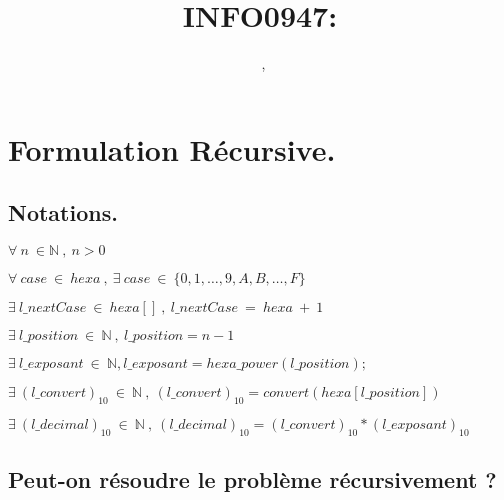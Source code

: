 \documentclass[a4paper, 11pt, oneside]{article}
\title{INFO0947: \intitule}
\author{\textsc{\Prenom}~\textsc{\Nom}, \matricule}
\date{}
\newcommand{\tablemat}{~}
\renewcommand{\tablemat}{\tableofcontents}
\begin{document}
\maketitle
\newpage
\tablemat
\newpage




\section{Formulation Récursive.}\label{formulation}

	\subsection{Notations.}	
	
	$\forall ~ n ~ \in \mathbb{N} ~ , ~ n > 0 $
	\vspace{2mm}
	
	$\forall ~ case ~ \in ~ hexa ~ , ~ \exists ~ case ~ \in ~ \{0, 1, \ldots , 9, A, B, \ldots , F\}$
	\vspace{2mm}
	
	$\exists ~ l\_nextCase ~ \in ~ hexa[] ~ , ~ l\_nextCase ~ = ~ hexa ~ + ~ 1 $
	\vspace{2mm}
	
	$\exists ~ l\_position ~ \in ~ \mathbb{N} ~ , ~ l\_position = n - 1$
	\vspace{2mm}
	
	$\exists ~ l\_exposant ~ \in ~ \mathbb{N} , l\_exposant = hexa\_power(l\_position);$
	\vspace{2mm}
	
	$\exists ~ (l\_convert)_{10} ~ \in ~ \mathbb{N} ~ , ~ (l\_convert)_{10} = convert(hexa[l\_position]) $
	\vspace{2mm}
	
	$\exists ~ (l\_decimal)_{10} ~ \in ~ \mathbb{N} ~ , ~ (l\_decimal)_{10} = (l\_convert)_{10} * (l\_exposant)_{10}$
	\vspace{2mm}
	
	\subsection{Peut-on résoudre le problème récursivement ?}
	
\end{document}
